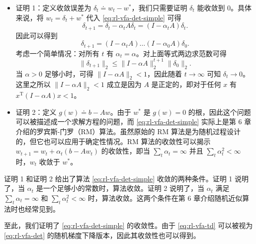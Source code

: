 \begin{itemize}
  \item 证明 1：定义收敛误差为 $\delta_t \doteq w_t - w^*$，我们只需要证明 $\delta_t$ 能收敛到 $0$。具体来说，将 $w_t = \delta_t + w^*$ 代入 \cref{eq:rl-vfa-det-simple} 可得
  \begin{equation*}
  \delta_{t+1} = \delta_{t} - \alpha_{t} A \delta_{t} = (I - \alpha_{t} A) \delta_{t}.
  \end{equation*}
  因此可以得到
  \begin{equation*}
  \delta_{t+1} = (I - \alpha_{t} A) \dots (I - \alpha_{0} A) \delta_{0}.
  \end{equation*}
  考虑一个简单情况：对所有 $t$ 有 $\alpha_{t} = \alpha$。对上面等式两边求范数可得
  \begin{equation*}
  \| \delta_{t+1} \|_{2} \leqslant \| I - \alpha A \|_{2}^{t+1} \| \delta_{0} \|_{2}.
  \end{equation*}
  当 $\alpha > 0$ 足够小时，可得 $\|I - \alpha A\|_{2} < 1$，因此随着 $t \to \infty$ 可知 $\delta_{t} \to 0$。这里之所以 $\|I - \alpha A\|_{2} < 1$ 成立是因为 $A$ 是正定的，即对于任何 $x$ 有 $x^{\mathrm{T}}(I - \alpha A)x < 1$。
  \item 证明 2：定义 $g(w) \doteq b - Aw$。由于 $w^{*}$ 是 $g(w) = 0$ 的根，因此这个问题可以被描述成一个求解方程的问题，而 \cref{eq:rl-vfa-det-simple} 实际上是第 6 章介绍的罗宾斯-门罗（RM）算法。虽然原始的 RM 算法是为随机过程设计的，但它也可以应用于确定性情况。RM 算法的收敛性可以揭示 $w_{t+1} = w_t + \alpha_t(b - Aw_t)$ 的收敛性，即当 $\sum_t \alpha_t = \infty$ 并且 $\sum_t \alpha_t^2 < \infty$ 时，$w_t$ 收敛于 $w^{*}$。
\end{itemize}

证明 1 和证明 2 给出了算法 \cref{eq:rl-vfa-det-simple} 收敛的两种条件。证明 1 说明了，当 $\alpha_{t}$ 是一个足够小的常数时，算法收敛。证明 2 说明了，当 $\alpha_{t}$ 满足 $\sum_{t} \alpha_{t} = \infty$ 和 $\sum_{t} \alpha_{t}^{2} < \infty$ 时，算法收敛。这两个条件在第 6 章介绍随机近似算法时也经常见到。

至此，我们证明了 \cref{eq:rl-vfa-det-simple} 的收敛性。由于 \cref{eq:rl-vfa-td} 可以被视为 \cref{eq:rl-vfa-det} 的随机梯度下降版本，因此其收敛性也可以得到。

